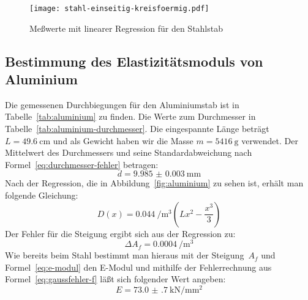 \begin{figure}
  \centering
  \texttt{[image: stahl-einseitig-kreisfoermig.pdf]}
  \caption{Meßwerte mit linearer Regression für den Stahlstab}
  \label{fig:stahl}
\end{figure}

\subsection{Bestimmung des Elastizitätsmoduls von Aluminium}

Die gemessenen Durchbiegungen für den Aluminiumstab ist in
Tabelle~\ref{tab:aluminium} zu finden. Die Werte zum Durchmesser in
Tabelle~\ref{tab:aluminium-durchmesser}. Die eingespannte Länge beträgt
$L=\SI{49.6}{\centi\metre}$ und als Gewicht haben wir die Masse
$m=\SI{5416}{\gram}$ verwendet. Der Mittelwert des Durchmessers und
seine Standardabweichung nach Formel~\eqref{eq:durchmesser-fehler} betragen:
%
\begin{equation}
  d = \SI{9.985(3)}{\milli\metre}
\end{equation}
%
Nach der Regression, die in Abbildung~\ref{fig:aluminium} zu sehen ist,
erhält man folgende Gleichung:
%
\begin{equation}
  D(x) = \SI{0.044}{\per\cubic\metre} \left(Lx^2 - \frac{x^3}{3}\right)
\end{equation}
%
Der Fehler für die Steigung ergibt sich aus der Regression zu:
%
\begin{equation}
  \Delta A_f = \SI{0.0004}{\per\cubic\metre}
\end{equation}
%
Wie bereits beim Stahl bestimmt man hieraus mit der Steigung~$A_f$ und
Formel~\eqref{eq:e-modul} den E-Modul und mithilfe der Fehlerrechnung
aus Formel~\eqref{eq:gaussfehler-f} läßt sich folgender Wert angeben:
%
\begin{equation}
  E = \SI{73.0(7)}{\kilo\newton\per\milli\metre\squared}  
\end{equation}

